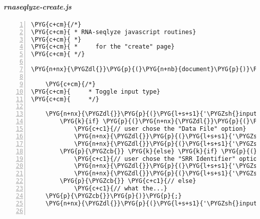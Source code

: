 \paragraph{\emph{rnaseqlyze-create.js}}
\label{rnaseqlyze-pdf:rnaseqlyze-create-js}
\begin{Verbatim}[commandchars=\\\{\},numbers=left,firstnumber=1,stepnumber=5]
\PYG{c+cm}{/*}
\PYG{c+cm}{ * RNA-seqlyze javascript routines}
\PYG{c+cm}{ *}
\PYG{c+cm}{ *     for the "create" page}
\PYG{c+cm}{ */}

\PYG{n+nx}{\PYGZdl{}}\PYG{p}{(}\PYG{n+nb}{document}\PYG{p}{)}\PYG{p}{.}\PYG{n+nx}{ready}\PYG{p}{(}\PYG{k+kd}{function}\PYG{p}{(}\PYG{p}{)} \PYG{p}{\PYGZob{}}

    \PYG{c+cm}{/*}
\PYG{c+cm}{     * Toggle input type}
\PYG{c+cm}{     */}

    \PYG{n+nx}{\PYGZdl{}}\PYG{p}{(}\PYG{l+s+s1}{'\PYGZsh{}input\PYGZus{}type\PYGZus{}radio'}\PYG{p}{)}\PYG{p}{.}\PYG{n+nx}{click}\PYG{p}{(}\PYG{k+kd}{function}\PYG{p}{(}\PYG{n+nx}{event}\PYG{p}{)} \PYG{p}{\PYGZob{}}
        \PYG{k}{if} \PYG{p}{(}\PYG{n+nx}{\PYGZdl{}}\PYG{p}{(}\PYG{n+nx}{event}\PYG{p}{.}\PYG{n+nx}{target}\PYG{p}{)}\PYG{p}{.}\PYG{n+nx}{hasClass}\PYG{p}{(}\PYG{l+s+s2}{"srr"}\PYG{p}{)}\PYG{p}{)} \PYG{p}{\PYGZob{}}
            \PYG{c+c1}{// user chose the "Data File" option}
            \PYG{n+nx}{\PYGZdl{}}\PYG{p}{(}\PYG{l+s+s1}{'\PYGZsh{}sra-controls'}\PYG{p}{)}\PYG{p}{.}\PYG{n+nx}{hide}\PYG{p}{(}\PYG{p}{)}\PYG{p}{;}
            \PYG{n+nx}{\PYGZdl{}}\PYG{p}{(}\PYG{l+s+s1}{'\PYGZsh{}srr-controls'}\PYG{p}{)}\PYG{p}{.}\PYG{n+nx}{show}\PYG{p}{(}\PYG{p}{)}\PYG{p}{;}
        \PYG{p}{\PYGZcb{}} \PYG{k}{else} \PYG{k}{if} \PYG{p}{(}\PYG{n+nx}{\PYGZdl{}}\PYG{p}{(}\PYG{n+nx}{event}\PYG{p}{.}\PYG{n+nx}{target}\PYG{p}{)}\PYG{p}{.}\PYG{n+nx}{hasClass}\PYG{p}{(}\PYG{l+s+s2}{"sra"}\PYG{p}{)}\PYG{p}{)} \PYG{p}{\PYGZob{}}
            \PYG{c+c1}{// user chose the "SRR Identifier" option}
            \PYG{n+nx}{\PYGZdl{}}\PYG{p}{(}\PYG{l+s+s1}{'\PYGZsh{}srr-controls'}\PYG{p}{)}\PYG{p}{.}\PYG{n+nx}{hide}\PYG{p}{(}\PYG{p}{)}\PYG{p}{;}
            \PYG{n+nx}{\PYGZdl{}}\PYG{p}{(}\PYG{l+s+s1}{'\PYGZsh{}sra-controls'}\PYG{p}{)}\PYG{p}{.}\PYG{n+nx}{show}\PYG{p}{(}\PYG{p}{)}\PYG{p}{;}
        \PYG{p}{\PYGZcb{}} \PYG{c+c1}{// else}
            \PYG{c+c1}{// what the...}
    \PYG{p}{\PYGZcb{}}\PYG{p}{)}\PYG{p}{;}
    \PYG{n+nx}{\PYGZdl{}}\PYG{p}{(}\PYG{l+s+s1}{'\PYGZsh{}input\PYGZus{}type\PYGZus{}radio .srr'}\PYG{p}{)}\PYG{p}{.}\PYG{n+nx}{click}\PYG{p}{(}\PYG{p}{)}\PYG{p}{;}


\end{Verbatim}
